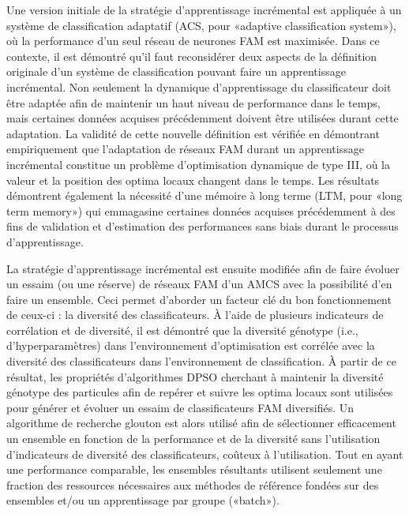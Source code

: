 Une version initiale de la stratégie d’apprentissage incrémental est appliquée à un système de classification adaptatif (ACS, pour «adaptive classification system»), où la performance d’un seul réseau de neurones FAM est maximisée. Dans ce contexte, il est démontré qu'il faut reconsidérer deux aspects de la définition originale d’un système de classification pouvant faire un apprentissage incrémental. Non seulement la dynamique d’apprentissage du classificateur doit être adaptée afin de maintenir un haut niveau de performance dans le temps, mais certaines données acquises précédemment doivent être utilisées durant cette adaptation. La validité de cette nouvelle définition est vérifiée en démontrant empiriquement que l’adaptation de réseaux FAM durant un apprentissage incrémental constitue un problème d’optimisation dynamique de type III, où la valeur et la position des optima locaux changent dans le temps. Les résultats démontrent également la nécessité d’une mémoire à long terme (LTM, pour «long term memory») qui emmagasine certaines données acquises précédemment à des fins de validation et d'estimation des performances sans biais durant le processus d'apprentissage.

La stratégie d’apprentissage incrémental est ensuite modifiée afin de faire évoluer un essaim (ou une réserve) de réseaux FAM d’un AMCS avec la possibilité d'en faire un ensemble. Ceci permet d’aborder un facteur clé du bon fonctionnement de ceux-ci : la diversité des classificateurs. 
À l’aide de plusieurs indicateurs de corrélation et de diversité, il est démontré que la diversité génotype (i.e., d’hyperparamètres) dans l'environnement d'optimisation est corrélée avec la diversité des classificateurs dans l'environnement de classification.
À partir de ce résultat, les propriétés d’algorithmes DPSO cherchant à maintenir la diversité génotype des particules afin de repérer et suivre les optima locaux sont utilisées pour générer et évoluer un essaim de classificateurs FAM diversifiés.
Un algorithme de recherche glouton est alors utilisé afin de sélectionner efficacement un ensemble en fonction de la performance et de la diversité sans l’utilisation d’indicateurs de diversité des classificateurs, coûteux à l’utilisation. Tout en ayant une performance comparable, les ensembles résultants utilisent seulement une fraction des ressources nécessaires aux méthodes de référence fondées sur des ensembles et/ou un apprentissage par groupe («batch»).


